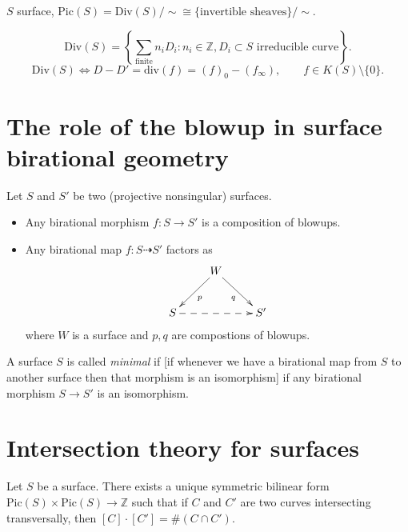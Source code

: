 \begin{definition}
\label{definition-picard}
$S$ surface,
$\text{Pic}(S) = \text{Div}(S)/\sim \cong
\{\text{invertible sheaves}\}/\sim$.

$$
\text{Div}(S)
=\left\{\sum_{\text{finite}}n_iD_i:
n_i \in \mathbb{Z},
D_i \subset S\text{ irreducible
curve}\right\}.
$$
$$
\text{Div}(S) \iff D-D'=\text{div}(f)=(f)_0 -
(f_\infty),\qquad
f \in K(S)\setminus \{0\}.
$$
\end{definition}



\section{The role of the blowup in surface
birational geometry}
\label{section-role-of-blowup}

\noindent
Let $S$ and $S'$ be two (projective
nonsingular) surfaces.
\begin{itemize}
\item Any birational morphism $f:S \to S'$
is a composition of blowups.

\item Any birational map $f:S \dashrightarrow
S'$
factors as
$$
\xymatrix{
&  W \ar[dl]^{p}\ar[dr]_q\\
S\ar@{-->}[rr]&& S'
}
$$
where $W$ is a surface and $p,q$ are
compostions
of blowups.
\end{itemize}


\begin{definition}
\label{definition-minimal-surface}
A surface $S$ is called {\it minimal} if
[if whenever we have a birational map from
$S$ to another surface then
that morphism is an isomorphism]
if any birational morphism $S \to S'$ is an
isomorphism.
\end{definition}

\section{Intersection theory for surfaces}
\label{section-intersection-surfaces}

\begin{theorem}
\label{theorem-intersection-form}
Let $S$ be a surface.
There exists a unique symmetric bilinear form
$\text{Pic}(S) \times \text{Pic}(S)\to
\mathbb{Z}$
such that
if $C$ and  $C'$ are two curves intersecting
transversally,
then $[C]\cdot[C']=\#(C \cap C')$.
\end{theorem}

